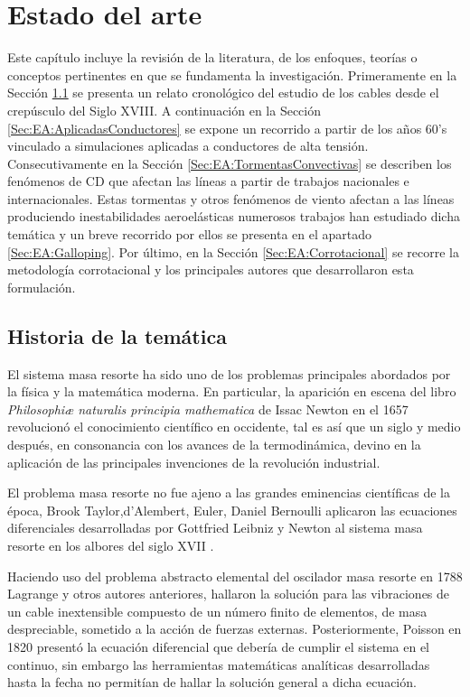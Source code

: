 \chapter{Estado del arte}\label{Cap:EstadoDelArte}\linenumbers

Este capítulo incluye la revisión de la literatura, de los enfoques, teorías o conceptos pertinentes en que se fundamenta la investigación. Primeramente en la Sección \ref{Sec:EA:Historia} se presenta un relato cronológico del estudio de los cables desde el crepúsculo del Siglo XVIII. A continuación en la Sección \ref{Sec:EA:AplicadasConductores} se expone un recorrido a partir de los años 60's vinculado a simulaciones aplicadas a conductores de alta tensión. Consecutivamente en la Sección \ref{Sec:EA:TormentasConvectivas} se describen los fenómenos de CD que afectan las líneas a partir de trabajos nacionales e internacionales. Estas tormentas y otros fenómenos de viento afectan a las líneas produciendo inestabilidades aeroelásticas numerosos trabajos han estudiado dicha temática y un breve recorrido por ellos se presenta en el apartado \ref{Sec:EA:Galloping}. Por último, en la Sección \ref{Sec:EA:Corrotacional} se recorre la metodología corrotacional y los principales autores que desarrollaron esta formulación. 

\section{Historia de la temática}\label{Sec:EA:Historia}
El sistema masa resorte ha sido uno de los problemas principales abordados por la física y la matemática moderna. En particular, la aparición en escena del libro \emph{Philosophiæ naturalis principia mathematica} de Issac Newton en el 1657 revolucionó el conocimiento científico en occidente, tal es así que  un siglo y medio después, en consonancia con los avances de la termodinámica, devino en la aplicación de las principales invenciones de la revolución industrial.

El problema masa resorte no fue ajeno a las grandes eminencias científicas de la época, Brook Taylor,d'Alembert, Euler, Daniel Bernoulli aplicaron las ecuaciones diferenciales desarrolladas por Gottfried Leibniz y Newton al sistema masa resorte en los albores del siglo XVII \citep{Starossek1991}.  

Haciendo uso del problema abstracto elemental del oscilador masa resorte en 1788 Lagrange y otros autores anteriores, hallaron la solución para las vibraciones de un cable inextensible compuesto de un número finito de elementos, de masa despreciable, sometido a la acción de fuerzas externas. Posteriormente, Poisson en 1820 presentó la ecuación diferencial que debería de cumplir el sistema en el continuo, sin embargo las herramientas matemáticas analíticas desarrolladas hasta la fecha no permitían de hallar la solución general a dicha ecuación.\citep{Irvine1974}

